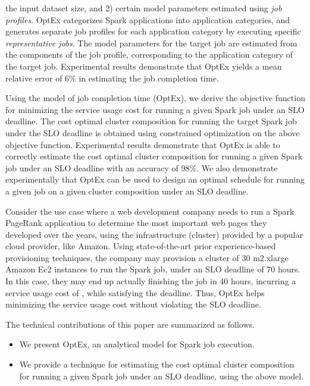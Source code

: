 \documentclass[conference]{IEEEtran}
\begin{document}
   the input dataset size, and 2) certain model parameters estimated using \emph{job profiles}. OptEx categorizes Spark applications into
  application categories, and generates separate job profiles for each application category by executing
  specific \emph{representative jobs}. The model parameters for the target job are estimated from the components
  of the job profile, corresponding to the application category of the target job.
  Experimental results demonstrate that OptEx yields
a mean relative error of 6\% in
estimating the job completion time. \par  Using the model of job completion time (OptEx), we derive the objective
 function for minimizing the service usage cost for running a given Spark job under an SLO deadline.
   The cost optimal cluster composition for running the target Spark job under the SLO deadline is obtained using constrained
    optimization on the above objective function.
Experimental results demonstrate that OptEx is able to correctly
  estimate the cost optimal cluster composition for running a given Spark job under an SLO deadline with
  an accuracy of 98\%.
  We also demonstrate experimentally that OptEx can be used to design
an optimal schedule for running a given job on a given cluster composition under an SLO deadline. \par Consider the use case where a web development company needs to run a Spark PageRank application to determine the most important web pages they developed over the years, using the infrastructure (cluster)
 provided by a popular cloud provider, like Amazon. Using state-of-the-art \cite{daniel2011prediction, Imai:2013:ARP:2588611.2588688, singer2010towards}
 prior experience-based provisioning techniques, the company may provision a  cluster of 30 m2.xlarge Amazon Ec2 instances
 to run the Spark job, under an SLO deadline of 70 hours. In this case,  they may end up actually
finishing the job in 40 hours, incurring a service usage cost of ,
 while satisfying the deadline. Thus, OptEx helps minimizing the service
 usage cost without violating the SLO deadline.
\par The technical contributions of this paper are summarized as follows.
  \begin{itemize}
  \item  We present OptEx, an analytical model for Spark \cite{Zaharia:2012:RDD:2228298.2228301} job execution. \item We provide a technique for estimating the cost optimal cluster composition for running a given Spark job under an SLO deadline, using the above model.
  \end{itemize}
\end{document}
